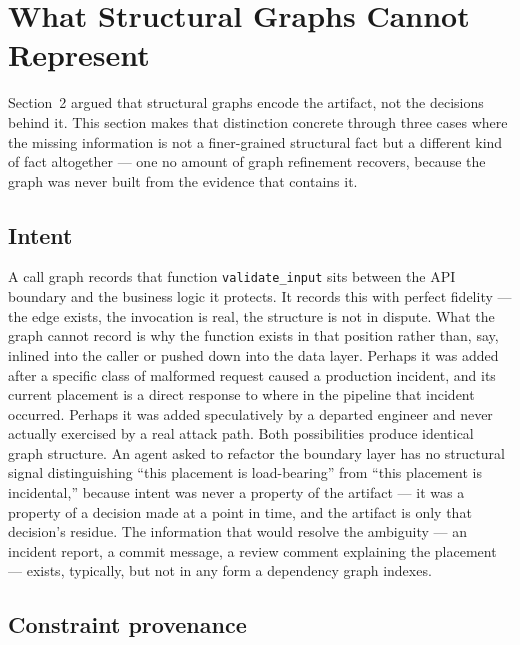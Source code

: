 \documentclass[11pt]{article}
\begin{document}
\section{What Structural Graphs Cannot Represent}

Section~2 argued that structural graphs encode the artifact, not the decisions behind it. This section makes that distinction concrete through three cases where the missing information is not a finer-grained structural fact but a different kind of fact altogether --- one no amount of graph refinement recovers, because the graph was never built from the evidence that contains it.

\subsection{Intent}

A call graph records that function \texttt{validate\_input} sits between the API boundary and the business logic it protects. It records this with perfect fidelity --- the edge exists, the invocation is real, the structure is not in dispute. What the graph cannot record is why the function exists in that position rather than, say, inlined into the caller or pushed down into the data layer. Perhaps it was added after a specific class of malformed request caused a production incident, and its current placement is a direct response to where in the pipeline that incident occurred. Perhaps it was added speculatively by a departed engineer and never actually exercised by a real attack path. Both possibilities produce identical graph structure. An agent asked to refactor the boundary layer has no structural signal distinguishing ``this placement is load-bearing'' from ``this placement is incidental,'' because intent was never a property of the artifact --- it was a property of a decision made at a point in time, and the artifact is only that decision's residue. The information that would resolve the ambiguity --- an incident report, a commit message, a review comment explaining the placement --- exists, typically, but not in any form a dependency graph indexes.

\subsection{Constraint provenance}
\end{document}
